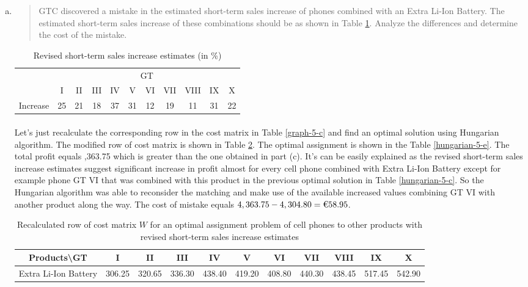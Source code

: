 \begin{enumerate}[(a)]
\item\begin{quote}GTC discovered a mistake in the estimated short-term sales increase of phones
combined with an Extra Li-Ion Battery. The estimated short-term sales increase
of these combinations should be as shown in Table \ref{new-inc}. Analyze the differences
and determine the cost of the mistake.\end{quote}

\begin{table}[H]
	\centering
	\caption{Revised short-term sales increase estimates (in \%)}
	\begin{tabular}{c|*{10}c}\hline
	\multirow{2}{*}{} & \multicolumn{10}{|c}{GT} \\ \cline{2-11}
	&I&II&III&IV&V&VI&VII&VIII&IX&X\\ \hline
Increase&25&21&18&37&31&12&19&11&31&22\\
\hline
	\end{tabular}
	\label{new-inc}
\end{table}

	\paragraph{}
	Let's just recalculate the corresponding row in the cost matrix in Table \ref{graph-5-c} and find an optimal solution using Hungarian algorithm. The modified row of cost matrix is shown in Table \ref{graph-5-e}. The optimal assignment is shown in the Table \ref{hungarian-5-e}. The total profit equals ,363.75 which is greater than the one obtained in part (c). It's can be easily explained as the revised short-term sales increase estimates suggest significant increase in profit almost for every cell phone combined with Extra Li-Ion Battery except for example phone GT VI that was combined with this product in the previous optimal solution in Table \ref{hungarian-5-c}. So the Hungarian algorithm was able to reconsider the matching and make use of the available increased values combining GT VI with another product along the way. The cost of mistake equals $4,363.75-4,304.80=\text{\texteuro}58.95$.

\begin{table}[H]
	\centering
	\caption{Recalculated row of cost matrix $W$ for an optimal assignment problem of cell phones to other products with revised short-term sales increase estimates}
	\begin{tabular}{|*{11}{c|}}\hline
Products\textbackslash GT & I & II & III & IV & V & VI & VII & VIII & IX & X\\\hline
Extra Li-Ion Battery & 306.25  & 320.65  & 336.30  & 438.40  & 419.20  & 408.80  & 440.30  & 438.45  & 517.45  & 542.90 \\ \hline
\end{tabular}
	\label{graph-5-e}
\end{table}


\end{enumerate}
